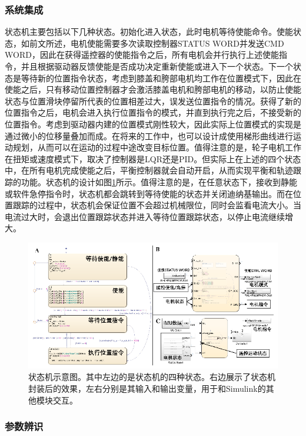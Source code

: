 \subsubsection{系统集成}
状态机主要包括以下几种状态。初始化进入状态，此时电机等待使能命令。使能状态，如前文所述，电机使能需要多次读取控制器STATUS WORD并发送CMD WORD，因此在获得遥控器的使能指令之后，所有电机会并行执行上述使能指令，并且根据驱动器反馈使能是否成功决定重新使能或进入下一个状态。下一个状态是等待新的位置指令状态，考虑到膝盖和胯部电机均工作在位置模式下，因此在使能之后，只有移动位置控制器才会激活膝盖电机和胯部电机的移动，以防止使能状态与位置滑块停留所代表的位置相差过大，误发送位置指令的情况。获得了新的位置指令之后，电机会进入执行位置指令的模式，并直到执行完之后，不接受新的位置指令。考虑到驱动器内建的位置模式刚性较大，因此实际上位置模式的实现是通过微小的位移量叠加而成。在将来的工作中，也可以设计成使用梯形曲线进行运动规划，从而可以在运动的过程中途改变目标位置。值得注意的是，轮子电机工作在扭矩或速度模式下，取决了控制器是LQR还是PID。但实际上在上述的四个状态中，在所有电机完成使能之后，平衡控制器就会自动开启，从而实现平衡和轨迹跟踪的功能。状态机的设计如图\ref{fig:sec5-stateflow}所示。值得注意的是，在任意状态下，接收到静能或软件急停指令时，状态机都会跳转到等待使能的状态并关闭迪纳基输出。而在位置跟踪的过程中，状态机会保证位置不会超过机械限位，同时会监看电流大小。当电流过大时，会退出位置跟踪状态并进入等待位置跟踪状态，以停止电流继续增大。

\begin{figure}
  \centering
  \includegraphics[width=1.0\linewidth]{figures/Sec5/stateflow.png}
  \caption{
  状态机示意图。其中左边的是状态机的四种状态。右边展示了状态机封装后的效果，左右分别是其输入和输出变量，用于和Simulink的其他模块交互。
  }
  \label{fig:sec5-stateflow}
   \vspace{6pt}
\end{figure}

\subsubsection{参数辨识}

